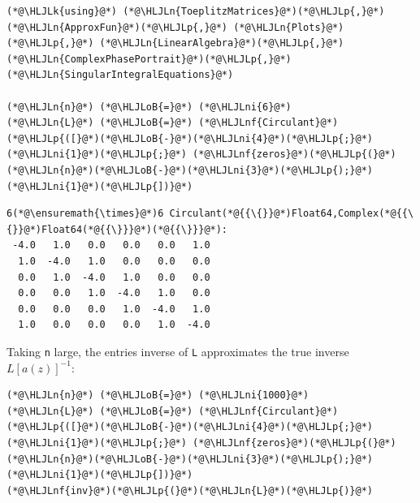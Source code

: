 \documentclass[12pt,a4paper]{article}
\newcommand{\HLJLk}[1]{\textcolor[RGB]{148,91,176}{\textbf{#1}}}
\newcommand{\HLJLn}[1]{#1}
\newcommand{\HLJLnf}[1]{\textcolor[RGB]{66,102,213}{#1}}
\newcommand{\HLJLni}[1]{\textcolor[RGB]{59,151,46}{#1}}
\newcommand{\HLJLoB}[1]{\textcolor[RGB]{102,102,102}{\textbf{#1}}}
\newcommand{\HLJLp}[1]{#1}
\begin{document}
\begin{lstlisting}
(*@\HLJLk{using}@*) (*@\HLJLn{ToeplitzMatrices}@*)(*@\HLJLp{,}@*) (*@\HLJLn{ApproxFun}@*)(*@\HLJLp{,}@*) (*@\HLJLn{Plots}@*)(*@\HLJLp{,}@*) (*@\HLJLn{LinearAlgebra}@*)(*@\HLJLp{,}@*) (*@\HLJLn{ComplexPhasePortrait}@*)(*@\HLJLp{,}@*) (*@\HLJLn{SingularIntegralEquations}@*)

(*@\HLJLn{n}@*) (*@\HLJLoB{=}@*) (*@\HLJLni{6}@*)
(*@\HLJLn{L}@*) (*@\HLJLoB{=}@*) (*@\HLJLnf{Circulant}@*)(*@\HLJLp{([}@*)(*@\HLJLoB{-}@*)(*@\HLJLni{4}@*)(*@\HLJLp{;}@*) (*@\HLJLni{1}@*)(*@\HLJLp{;}@*) (*@\HLJLnf{zeros}@*)(*@\HLJLp{(}@*)(*@\HLJLn{n}@*)(*@\HLJLoB{-}@*)(*@\HLJLni{3}@*)(*@\HLJLp{);}@*) (*@\HLJLni{1}@*)(*@\HLJLp{])}@*)
\end{lstlisting}

\begin{lstlisting}
6(*@\ensuremath{\times}@*)6 Circulant(*@{{\{}}@*)Float64,Complex(*@{{\{}}@*)Float64(*@{{\}}}@*)(*@{{\}}}@*):
 -4.0   1.0   0.0   0.0   0.0   1.0
  1.0  -4.0   1.0   0.0   0.0   0.0
  0.0   1.0  -4.0   1.0   0.0   0.0
  0.0   0.0   1.0  -4.0   1.0   0.0
  0.0   0.0   0.0   1.0  -4.0   1.0
  1.0   0.0   0.0   0.0   1.0  -4.0
\end{lstlisting}


Taking \texttt{n} large, the entries inverse of \texttt{L} approximates the true inverse $L[a(z)]^{-1}$:


\begin{lstlisting}
(*@\HLJLn{n}@*) (*@\HLJLoB{=}@*) (*@\HLJLni{1000}@*)
(*@\HLJLn{L}@*) (*@\HLJLoB{=}@*) (*@\HLJLnf{Circulant}@*)(*@\HLJLp{([}@*)(*@\HLJLoB{-}@*)(*@\HLJLni{4}@*)(*@\HLJLp{;}@*) (*@\HLJLni{1}@*)(*@\HLJLp{;}@*) (*@\HLJLnf{zeros}@*)(*@\HLJLp{(}@*)(*@\HLJLn{n}@*)(*@\HLJLoB{-}@*)(*@\HLJLni{3}@*)(*@\HLJLp{);}@*) (*@\HLJLni{1}@*)(*@\HLJLp{])}@*)
(*@\HLJLnf{inv}@*)(*@\HLJLp{(}@*)(*@\HLJLn{L}@*)(*@\HLJLp{)}@*)
\end{lstlisting}
\end{document}
